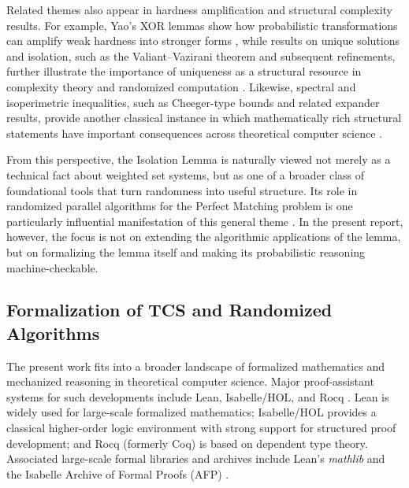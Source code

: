 Related themes also appear in hardness amplification and structural complexity results.
For example, Yao's XOR lemmas show how probabilistic transformations can amplify weak hardness into stronger forms \cite{goldreich1995yao,yao1982xor},
while results on unique solutions and isolation, such as the Valiant--Vazirani theorem and subsequent refinements, further illustrate the importance of uniqueness as a structural resource in complexity theory and randomized computation \cite{VALIANT198685,chari1995isolation}.
Likewise, spectral and isoperimetric inequalities, such as Cheeger-type bounds and related expander results, provide another classical instance in which mathematically rich structural statements have important consequences across theoretical computer science \cite{Cheeger2015inequality,alon1986eigenvalues,ALON198573}.

From this perspective, the Isolation Lemma is naturally viewed not merely as a technical fact about weighted set systems, but as one of a broader class of foundational tools that turn randomness into useful structure.
Its role in randomized parallel algorithms for the Perfect Matching problem is one particularly influential manifestation of this general theme \cite{mulmuley1987matching,lovasz1979determinants}.
In the present report, however, the focus is not on extending the algorithmic applications of the lemma, but on formalizing the lemma itself and making its probabilistic reasoning machine-checkable.

\subsection{Formalization of TCS and Randomized Algorithms}

The present work fits into a broader landscape of formalized mathematics and mechanized reasoning in theoretical computer science.
Major proof-assistant systems for such developments include Lean, Isabelle/HOL, and Rocq \cite{lean, isabelle, rocq}.
Lean is widely used for large-scale formalized mathematics; Isabelle/HOL provides a classical higher-order logic environment with strong support for structured proof development; and Rocq (formerly Coq) is based on dependent type theory.
Associated large-scale formal libraries and archives include Lean's \textit{mathlib} and the Isabelle Archive of Formal Proofs (AFP) \cite{mathlib, afp}.

